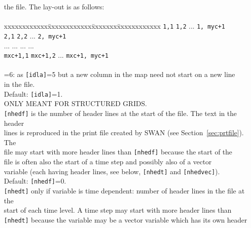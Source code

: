 \documentclass[12pt]{book}
\begin{document}
\begin{tabbing}
                              the file. The lay-out is as follows:\\
                              \\
                              \pushtabs
                              xxxxxxxxxxxx\=xxxxxxxxxxxx\=xxxxxxx\=xxxxxxxxxxxx \kill
                              {\tt 1,1} \> {\tt 1,2} \> ... \> {\tt 1, myc+1} \\
                              {\tt 2,1} \> {\tt 2,2} \> ... \> {\tt 2, myc+1} \\
                              ...           \> ...           \> ... \> ...              \\
                              {\tt mxc+1,1} \> {\tt mxc+1,2} \> ... \> {\tt mxc+1, myc+1} \\
                              \poptabs
                              \-\\
                       =6: \> as {\tt [idla]}=5 but a new column in the map need not start on a new line\+\\
                              in the file.\-\\
                       \poptabs
                       Default: {\tt [idla]}=1.\\
                       ONLY MEANT FOR STRUCTURED GRIDS.\-\\
{\tt [nhedf]}       \> is the number of header lines at the start of the file. The text in the header\+\\
                       lines is reproduced in the print file created by SWAN (see Section~\ref{sec:prtfile}). The\\
                       file may start with more header lines than {\tt [nhedf]} because the start of the\\
                       file is often also the start of a time step and possibly also of a vector\\
                       variable (each having header lines, see below, {\tt [nhedt]} and {\tt [nhedvec]}).\\
                       Default: {\tt [nhedf]}=0.\-\\
{\tt [nhedt]}       \> only if variable is time dependent: number of header lines in the file at the\+\\
                       start of each time level. A time step may start with more header lines than\\
                       {\tt [nhedt]} because the variable may be a vector variable which has its own header\\

\end{tabbing}
\end{document}
